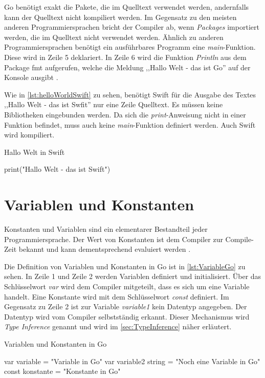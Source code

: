 Go benötigt exakt die Pakete, die im Quelltext verwendet werden, andernfalls kann der Quelltext nicht kompiliert werden. 
Im Gegensatz zu den meisten anderen Programmiersprachen bricht der Compiler ab, wenn \emph{Packages} importiert werden, die im Quelltext nicht verwendet werden.
Ähnlich zu anderen Programmiersprachen benötigt ein ausführbares Programm eine \emph{main}-Funktion.
Diese wird in Zeile 5 deklariert.
In Zeile 6 wird die Funktion \emph{Println} aus dem Package fmt aufgerufen, welche die Meldung ,,Hallo Welt - das ist Go'' auf der Konsole ausgibt \cite{Donovan.2016}.


Wie in \autoref{lst:helloWorldSwift} zu sehen, benötigt Swift für die Ausgabe des Textes ,,Hallo Welt - das ist Swfit'' nur eine Zeile Quelltext.
Es müssen keine Bibliotheken eingebunden werden. Da sich die \emph{print}-Anweisung nicht in einer Funktion befindet, muss auch keine \emph{main}-Funktion definiert werden\cite{Apple.2017}.
Auch Swift wird kompiliert.

\begin{listing}[H]
\caption{Hallo Welt in Swift}
\label{lst:helloWorldSwift}
\begin{SwiftCode}
print("Hallo Welt - das ist Swift")
\end{SwiftCode}
\end{listing}

\section{Variablen und Konstanten}
Konstanten und Variablen sind ein elementarer Bestandteil jeder Programmiersprache. 
Der Wert von Konstanten ist dem Compiler zur Compile-Zeit bekannt und kann dementsprechend evaluiert werden \cite{Donovan.2016}. 

Die Definition von Variablen und Konstanten in Go ist in \autoref{lst:VariableGo} zu sehen.
In Zeile 1 und Zeile 2 werden Variablen definiert und initialisiert.
Über das Schlüsselwort \emph{var} wird dem Compiler mitgeteilt, dass es sich um eine Variable handelt.
Eine Konstante wird mit dem Schlüsselwort \emph{const} definiert.
Im Gegensatz zu Zeile 2 ist zur Variable \emph{variable1} kein Datentyp angegeben. 
Der Datentyp wird vom Compiler selbstständig erkannt. 
Dieser Mechanismus wird \emph{Type Inference} genannt und wird im \autoref{sec:TypeInference}  näher erläutert.

\begin{listing}
\caption{Variablen und Konstanten in Go}
\label{lst:VariableGo}
\begin{GoCode}
var variable = "Variable in Go"
var variable2 string = "Noch eine Variable in Go"
const konstante = "Konstante in Go"
\end{GoCode}
\end{listing}

